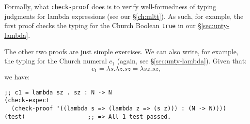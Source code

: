 \vspace{0.3cm}

Formally, what \texttt{check-proof} does is to verify well-formedness of
typing judgments for lambda expressions (see our \S\ref{ch:mltt}). As such,
for example, the first proof checks the typing for the Church Boolean
\texttt{true} in our \S\ref{sec:unty-lambda}.

The other two proofs are just simple exercises. We can also write, for example,
the typing for the Church numeral $ c_1 $ (again, see \S\ref{sec:unty-lambda}).
Given that:
\[
  c_1 = \lambda s . \lambda z . sz = \lambda sz.sz,
\]
we have:
{
  \small
\begin{verbatim}
;; c1 = lambda sz . sz : N -> N
(check-expect
  (check-proof '((lambda s => (lambda z => (s z))) : (N -> N))))
(test)                  ;; => All 1 test passed.
\end{verbatim}
}



